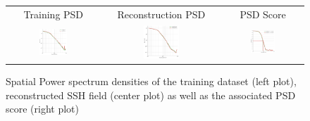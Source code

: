 \documentclass[draft]{agujournal2019}
\begin{document}
\begin{figure}[H]

\small
\begin{center}
\setlength{\tabcolsep}{1pt}
\begin{tabular}{ccc}

\hspace{3mm} Training PSD & 
\hspace{3mm} Reconstruction PSD & 
\hspace{3mm} PSD Score  \\


\includegraphics[width=0.32\textwidth]{figures/plots/isotrop_psd_rea_train.png} &
\includegraphics[width=0.32\textwidth]{figures/plots/isotrop_psd_rea_rec.png} &
\includegraphics[width=0.32\textwidth]{figures/plots/rea_1d_psd_score.png}


\end{tabular}
\vspace{-3mm}
\caption{
Spatial Power spectrum densities of the training dataset (left plot), reconstructed SSH field (center plot) as well as the associated PSD score (right plot)}\vspace{-5mm}
\label{fig:reapsd}
\end{center}
\end{figure}
\end{document}
